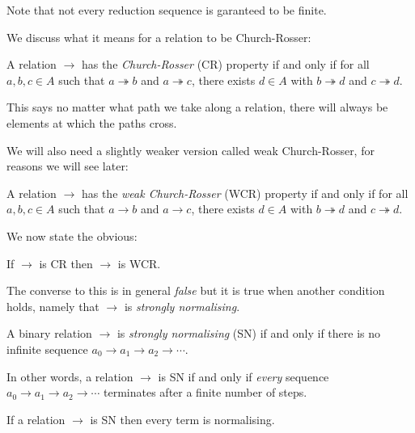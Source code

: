 \begin{remark}
    Note that not every reduction sequence is garanteed to be finite.
\end{remark}

We discuss what it means for a relation to be Church-Rosser:

\begin{defin}
    A relation $\to$ has the \emph{Church-Rosser} (CR) property if and only if for all $a,b,c \in A$ such that $a \twoheadrightarrow b$ and $a \twoheadrightarrow c$, there exists $d \in A$ with $b \twoheadrightarrow d$ and $c \twoheadrightarrow d$.
\end{defin}

\begin{remark}
    This says no matter what path we take along a relation, there will always be elements at which the paths cross.
\end{remark}

We will also need a slightly weaker version called weak Church-Rosser, for reasons we will see later:

\begin{defin}
    A relation $\to$ has the \emph{weak Church-Rosser} (WCR) property if and only if for all $a, b, c \in A$ such that $a \to b$ and $a \to c$, there exists $d \in A$ with $b \twoheadrightarrow d$ and $c \twoheadrightarrow d$.
\end{defin}

We now state the obvious:

\begin{cor}\label{cr_is_wcr}
    If $\to$ is CR then $\to$ is WCR.
\end{cor}

The converse to this is in general \emph{false} but it is true when another condition holds, namely that $\to$ is \emph{strongly normalising}.

\begin{defin}
    A binary relation $\to$ is \emph{strongly normalising} (SN) if and only if there is no infinite sequence $a_0 \to a_1 \to a_2 \to  \cdots$.
\end{defin}

\begin{remark}
    In other words, a relation $\to$ is SN if and only if \emph{every} sequence $a_0 \to a_1 \to a_2 \to  \cdots$ terminates after a finite number of steps.
\end{remark}

\begin{cor}
    If a relation $\to$ is SN then every term is normalising.
\end{cor}

